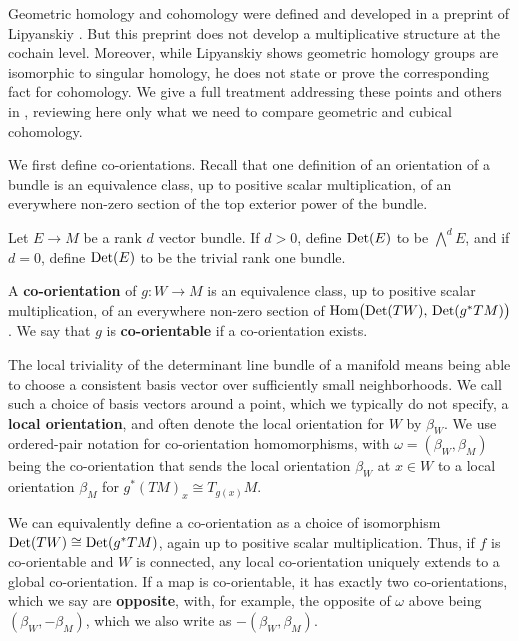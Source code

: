 Geometric homology and cohomology were defined and developed in a preprint of Lipyanskiy \cite{Lipy14}.
But this preprint does not develop a multiplicative structure at the cochain level.
Moreover, while Lipyanskiy shows geometric homology groups are isomorphic to singular homology, he does not state or prove the corresponding fact for cohomology.
We give a full treatment addressing these points and others in \cite{medina2022foundations}, reviewing here only what we need to compare geometric and cubical cohomology.

We first define co-orientations.
Recall that one definition of an orientation of a bundle is an equivalence class, up to positive scalar multiplication, of an everywhere non-zero section of the top exterior power of the bundle.

\begin{definition}\label{D:co-orientations}
	Let $E \to M$ be a rank $d$ vector bundle.
	If $d > 0$, define ${\rm Det}(E)$ to be $\bigwedge^d E$, and if $d = 0$, define ${\rm Det}(E)$ to be the trivial rank one bundle.

	A \textbf{co-orientation} of $g \colon W \to M$ is an equivalence class, up to positive scalar multiplication, of an everywhere non-zero section of $\textup{Hom} \big( {\rm Det}(TW),\, {\rm Det}(g^*TM) \big)$.
	We say that $g$ is \textbf{co-orientable} if a co-orientation exists.
\end{definition}

The local triviality of the determinant line bundle of a manifold means being able to choose a consistent basis vector over sufficiently small neighborhoods.
We call such a choice of basis vectors around a point, which we typically do not specify, a \textbf{local orientation}, and often denote the local orientation for $W$ by $\beta_W$.
We use ordered-pair notation for co-orientation homomorphisms, with $\omega = (\beta_W, \beta_M)$ being the co-orientation that sends the local orientation $\beta_W$ at $x\in W$ to a local orientation $\beta_M$ for $g^*(TM)_x\cong T_{g(x)}M$.

We can equivalently define a co-orientation as a choice of isomorphism ${\rm Det}(TW)\cong {\rm Det}(g^*TM)$, again up to positive scalar multiplication.
Thus, if $f$ is co-orientable and $W$ is connected, any local co-orientation uniquely extends to a global co-orientation.
If a map is co-orientable, it has exactly two co-orientations, which we say are \textbf{opposite}, with, for example, the opposite of $\omega$ above being $(\beta_W, -\beta_M)$, which we also write as $-(\beta_W, \beta_M)$.

